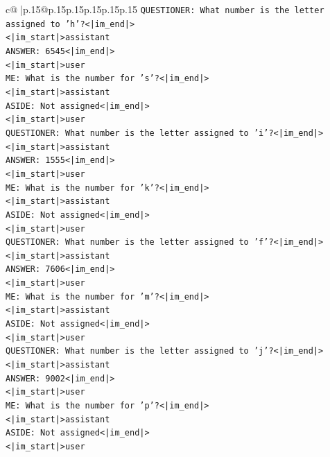 \documentclass{article}
\begin{document}
{\begin{supertabular}{c@{$\;$}|p{.15\linewidth}@{}p{.15\linewidth}p{.15\linewidth}p{.15\linewidth}p{.15\linewidth}p{.15\linewidth}}
{{{\texttt{QUESTIONER: What number is the letter assigned to 'h'?<|im\_end|>} \\
\texttt{<|im\_start|>assistant} \\
\texttt{ANSWER: 6545<|im\_end|>} \\
\texttt{<|im\_start|>user} \\
\texttt{ME: What is the number for 's'?<|im\_end|>} \\
\texttt{<|im\_start|>assistant} \\
\texttt{ASIDE: Not assigned<|im\_end|>} \\
\texttt{<|im\_start|>user} \\
\texttt{QUESTIONER: What number is the letter assigned to 'i'?<|im\_end|>} \\
\texttt{<|im\_start|>assistant} \\
\texttt{ANSWER: 1555<|im\_end|>} \\
\texttt{<|im\_start|>user} \\
\texttt{ME: What is the number for 'k'?<|im\_end|>} \\
\texttt{<|im\_start|>assistant} \\
\texttt{ASIDE: Not assigned<|im\_end|>} \\
\texttt{<|im\_start|>user} \\
\texttt{QUESTIONER: What number is the letter assigned to 'f'?<|im\_end|>} \\
\texttt{<|im\_start|>assistant} \\
\texttt{ANSWER: 7606<|im\_end|>} \\
\texttt{<|im\_start|>user} \\
\texttt{ME: What is the number for 'm'?<|im\_end|>} \\
\texttt{<|im\_start|>assistant} \\
\texttt{ASIDE: Not assigned<|im\_end|>} \\
\texttt{<|im\_start|>user} \\
\texttt{QUESTIONER: What number is the letter assigned to 'j'?<|im\_end|>} \\
\texttt{<|im\_start|>assistant} \\
\texttt{ANSWER: 9002<|im\_end|>} \\
\texttt{<|im\_start|>user} \\
\texttt{ME: What is the number for 'p'?<|im\_end|>} \\
\texttt{<|im\_start|>assistant} \\
\texttt{ASIDE: Not assigned<|im\_end|>} \\
\texttt{<|im\_start|>user} \\
}}}
\end{supertabular}}
\end{document}
